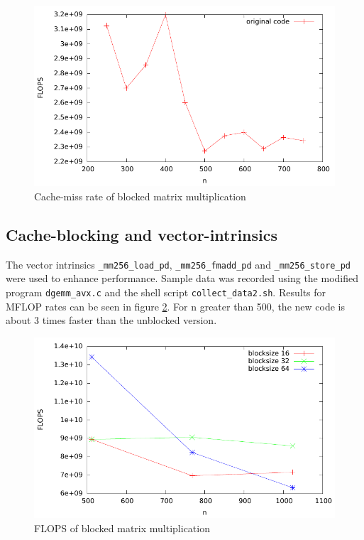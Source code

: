 \documentclass[11pt]{article}
\begin{document}
\begin{figure}[h]
  \begin{center}
    \includegraphics{../graphics/graph_unblocked.pdf}	%
    \caption{Cache-miss rate of blocked matrix multiplication}
    \label{blocked_cache}
  \end{center}
\end{figure}

\subsection*{Cache-blocking and vector-intrinsics}

The vector intrinsics \texttt{\_mm256\_load\_pd}, \texttt{\_mm256\_fmadd\_pd} and \texttt{\_mm256\_store\_pd} were used to enhance performance. Sample data was recorded using the modified program \texttt{dgemm\_avx.c} and the shell script \texttt{collect\_data2.sh}. Results for MFLOP rates can be seen in figure \ref{avx_flops}. For n greater than 500, the new code is about 3 times faster than the unblocked version.

\begin{figure}[h]
  \begin{center}
    \includegraphics{../graphics/graph_avx.pdf}	
    \caption{FLOPS of blocked matrix multiplication}
    \label{avx_flops}
  \end{center}
\end{figure}
\end{document}

